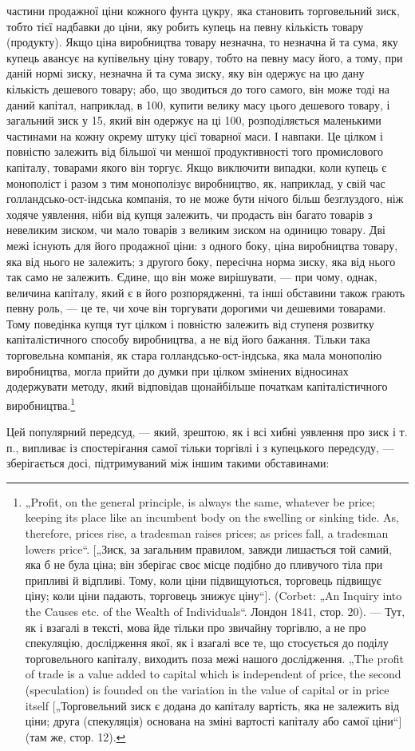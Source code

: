 частини продажної ціни кожного фунта цукру, яка становить
торговельний зиск, тобто тієї надбавки до ціни, яку робить
купець на певну кількість товару (продукту). Якщо ціна виробництва
товару незначна, то незначна й та сума, яку купець
авансує на купівельну ціну товару, тобто на певну масу його,
а тому, при даній нормі зиску, незначна й та сума зиску, яку
він одержує на цю дану кількість дешевого товару; або, що
зводиться до того самого, він може тоді на даний капітал, наприклад,
в 100, купити велику масу цього дешевого товару,
і загальний зиск у 15, який він одержує на ці 100, розподіляється
маленькими частинами на кожну окрему штуку цієї товарної
маси. І навпаки. Це цілком і повністю залежить від більшої
чи меншої продуктивності того промислового капіталу, товарами
якого він торгує. Якщо виключити випадки, коли купець є монополіст
і разом з тим монополізує виробництво, як, наприклад,
у свій час голландсько-ост-індська компанія, то не може бути
нічого більш безглуздого, ніж ходяче уявлення, ніби від купця
залежить, чи продасть він багато товарів з невеликим зиском,
чи мало товарів з великим зиском на одиницю товару. Дві
межі існують для його продажної ціни: з одного боку, ціна виробництва
товару, яка від нього не залежить; з другого боку, пересічна
норма зиску, яка від нього так само не залежить. Єдине,
що він може вирішувати, — при чому, однак, величина капіталу,
який є в його розпорядженні, та інші обставини також грають
певну роль, — це те, чи хоче він торгувати дорогими чи дешевими
товарами. Тому поведінка купця тут цілком і повністю залежить
від ступеня розвитку капіталістичного способу виробництва,
а не від його бажання. Тільки така торговельна компанія, як стара
голландсько-ост-індська, яка мала монополію виробництва, могла
прийти до думки при цілком змінених відносинах додержувати
методу, який відповідав щонайбільше початкам капіталістичного
виробництва.\footnote{
„Profit, on the general principle, is always the same, whatever be price;
keeping its place like an incumbent body on the swelling or sinking tide. As,
therefore, prices rise, a tradesman raises prices; as prices fall, a tradesman lowers
price“. [„Зиск, за загальним правилом, завжди лишається той самий, яка б не була
ціна; він зберігає своє місце подібно до пливучого тіла при припливі й відпливі.
Тому, коли ціни підвищуються, торговець підвищує ціну; коли ціни падають,
торговець знижує ціну“]. (Corbet: „An Inquiry into the Causes etc. of the Wealth
of Individuals“. Лондон 1841, стор. 20). — Тут, як і взагалі в тексті, мова йде
тільки про звичайну торгівлю, а не про спекуляцію, дослідження якої, як і взагалі
все те, що стосується до поділу торговельного капіталу, виходить поза
межі нашого дослідження. „The profit of trade is a value added to capital which
is independent of price, the second (speculation) is founded on the variation in
the value of capital or in price itself [„Торговельний зиск є додана до капіталу
вартість, яка не залежить від ціни; друга (спекуляція) основана на зміні вартості
капіталу або самої ціни“] (там же, стор. 12).
}

Цей популярний передсуд, — який, зрештою, як і всі хибні
уявлення про зиск і т. п., випливає із спостерігання самої тільки
торгівлі і з купецького передсуду, — зберігається досі, підтримуваний
між іншим такими обставинами:
